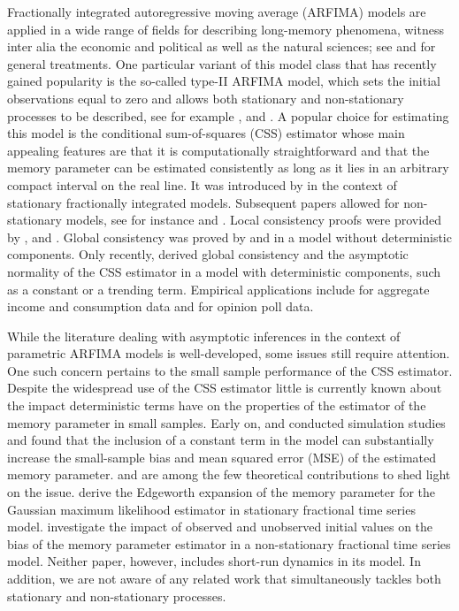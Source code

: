 {{Fractionally integrated autoregressive moving average (ARFIMA) models are applied in a wide range of fields for describing long-memory phenomena, witness inter alia the economic and political as well as the natural sciences; see
\textcite{hassler2019time} and \textcite{hualde2021frac} for general treatments. One particular variant of this model class that has recently gained popularity is the so-called type-II ARFIMA model, which sets the initial observations
equal to zero and allows both stationary and non-stationary processes to be described, see for example \textcite{nielsen2004efficient}, \textcite{ robinson2005distance} and \textcite{johansen2008representation}. A popular choice for estimating this model is the conditional sum-of-squares (CSS) estimator whose
main appealing features are that it is computationally straightforward and that the memory parameter can be estimated consistently as long as it lies in an arbitrary compact interval on the real line.
It was introduced by \textcite{li1986fractional} in the context of stationary fractionally integrated models. Subsequent papers allowed for non-stationary models, see for instance \textcite{beran1995maximum} and
\textcite{velasco2000whittle}. Local consistency proofs were provided by \textcite{tanaka1999nonstationary}, \textcite{nielsen2004efficient} and \textcite{robinson2006conditional}. Global consistency was proved by \textcite{hualde2011gaussian} and
\textcite{nielsen2015asymptotics} in a model without deterministic components.  Only recently, \textcite{hualde2020truncated,hualde2021truncated} derived global consistency and the asymptotic normality of the CSS estimator in a
model with deterministic components, such as a constant or a trending term. Empirical applications include \textcite{hualde2011gaussian} for aggregate income and consumption data and \textcite{johansen2016role} for opinion
poll data.

While the literature dealing with asymptotic inferences in the context of parametric ARFIMA models is well-developed, some issues still require attention. One such concern pertains to the small sample performance of the CSS
estimator. Despite the widespread use of the CSS estimator little is currently known about the impact deterministic terms have on the properties of the estimator of the memory parameter in small samples.  Early on,
\textcite{chung1993small} and \textcite{cheung1994maximum} conducted simulation studies and found that the inclusion of a constant term in the model can substantially increase the small-sample bias and mean squared error (MSE) of the
estimated memory parameter. \textcite{lieberman2005expansions} and \textcite{johansen2016role} are among the few theoretical contributions to shed light on the issue. \textcite{lieberman2005expansions}
derive the Edgeworth expansion of the memory parameter for the Gaussian maximum likelihood estimator in stationary fractional time series model. \textcite{johansen2016role} investigate the impact of observed and unobserved initial
values on the bias of the memory parameter estimator in a non-stationary fractional time series model. Neither paper, however, includes short-run dynamics in its model. In addition, we are not aware of any related work that
simultaneously tackles both stationary and non-stationary processes.

}}
